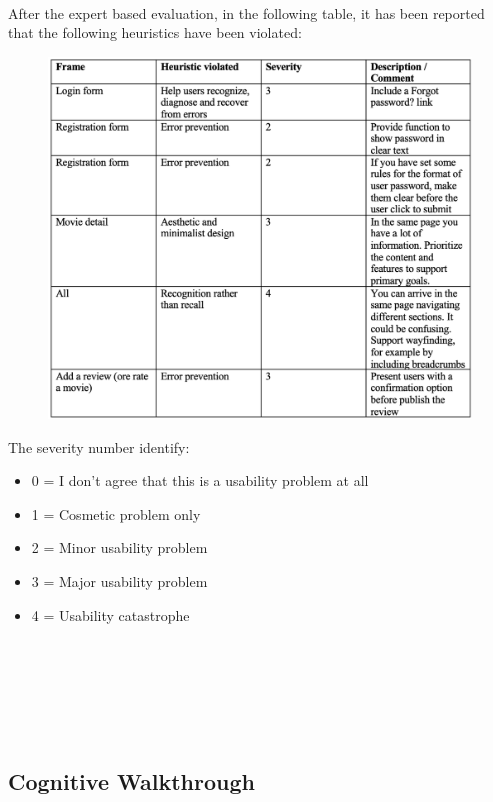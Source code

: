 \documentclass[12pt, a4paper]{article}
\numberwithin{figure}{section}
\begin{document}
\mbox{}\\
\noindent
After the expert based evaluation, in the following table, it has been reported that the following
heuristics have been violated:
\begin{figure}[H]
	\centering
	\includegraphics[width=1\textwidth]{images/heuristicEvaluation.png}\\
\end{figure}
\noindent
The severity number identify:
\begin{itemize}
	\item 0 = I don’t agree that this is a usability problem at all
	\item 1 = Cosmetic problem only
	\item 2 = Minor usability problem
	\item 3 = Major usability problem
	\item 4 = Usability catastrophe
\end{itemize}
\mbox{}\\\\\\\\\\
\subsection{Cognitive Walkthrough}
\end{document}
